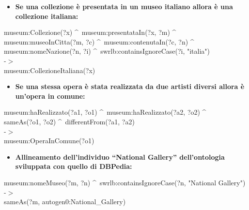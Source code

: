\documentclass[12pt]{article}
\begin{document}
\begin{itemize}
 \item \textbf{Se una collezione è presentata in un museo italiano allora è una collezione italiana:}
\end{itemize} 
\begin{center}
museum:Collezione(?x) \textasciicircum \, museum:presentataIn(?x, ?m) \textasciicircum \\
museum:museoInCitta(?m, ?c) \textasciicircum \, museum:contenutaIn(?c, ?n) \textasciicircum \\
museum:nomeNazione(?n, ?i) \textasciicircum \, swrlb:containsIgnoreCase(?i, "italia") \\
-$>$ \\
museum:CollezioneItaliana(?x)
\end{center}

\begin{itemize}
 \item \textbf{Se una stessa opera è stata realizzata da due artisti diversi allora è un’opera in comune:}
\end{itemize} 
\begin{center}
museum:haRealizzato(?a1, ?o1) \textasciicircum \, museum:haRealizzato(?a2, ?o2) \textasciicircum \\
sameAs(?o1, ?o2) \textasciicircum \, differentFrom(?a1, ?a2) \\
-$>$ \\
museum:OperaInComune(?o1)
\end{center}

\begin{itemize}
 \item \textbf{Allineamento dell’individuo “National Gallery” dell’ontologia sviluppata con quello di DBPedia:}
\end{itemize} 
\begin{center}
museum:nomeMuseo(?m, ?n) \textasciicircum \,
swrlb:containsIgnoreCase(?n, "National Gallery") \\
-$>$ \\
sameAs(?m, autogen0:National\_Gallery)
\end{center}
\newpage
\end{document}
